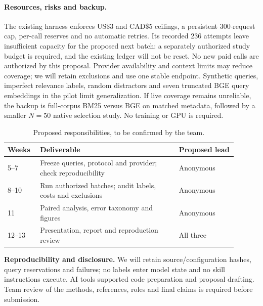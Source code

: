 \documentclass{article}
\begin{document}
\paragraph{Resources, risks and backup.}
The existing harness enforces US\$3 and CAD\$5 ceilings, a persistent 300-request
cap, per-call reserves and no automatic retries. Its recorded 236 attempts leave
insufficient capacity for the proposed next batch: a separately authorized study
budget is required, and the existing ledger will not be reset. No new paid calls
are authorized by this proposal. Provider availability and context limits may
reduce coverage; we will retain exclusions and use one stable endpoint. Synthetic
queries, imperfect relevance labels, random distractors and seven truncated BGE
query embeddings in the pilot limit generalization. If live coverage remains
unreliable, the backup is full-corpus BM25 versus BGE on matched metadata, followed
by a smaller $N=50$ native selection study. No training or GPU is required.

\begin{table}[h]
\centering
\small
\begin{tabular}{p{0.12\linewidth}p{0.55\linewidth}p{0.23\linewidth}}
\toprule
Weeks & Deliverable & Proposed lead \\
\midrule
5--7 & Freeze queries, protocol and provider; check reproducibility & Anonymous \\
8--10 & Run authorized batches; audit labels, costs and exclusions & Anonymous \\
11 & Paired analysis, error taxonomy and figures & Anonymous \\
12--13 & Presentation, report and reproduction review & All three \\
\bottomrule
\end{tabular}
\caption{Proposed responsibilities, to be confirmed by the team.}
\label{tab:timeline}
\end{table}

\noindent\textbf{Reproducibility and disclosure.}
We will retain source/configuration hashes, query reservations and failures; no
labels enter model state and no skill instructions execute. AI tools supported
code preparation and proposal drafting. Team review of the methods, references,
roles and final claims is required before submission.

\clearpage


\end{document}
